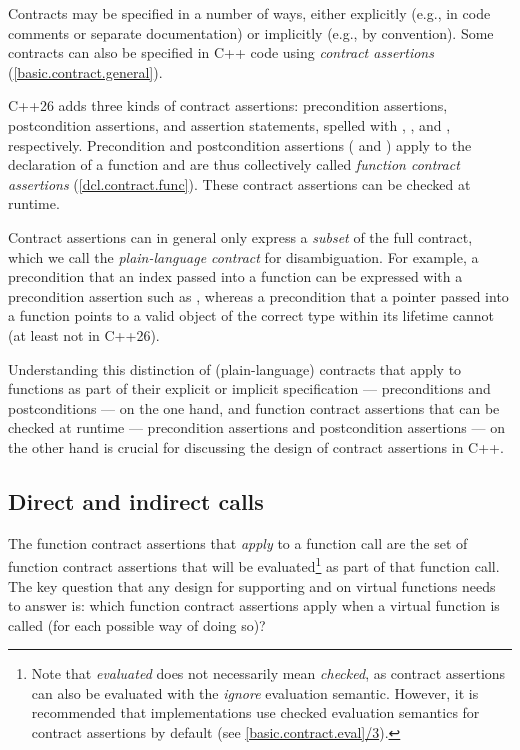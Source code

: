 Contracts may be specified in a number of ways, either explicitly (e.g., in code comments or separate documentation) or implicitly (e.g., by convention). Some contracts can also be specified in C++ code using \emph{contract assertions} (\href{https://eel.is/c++draft/basic.contract.general}{[basic.contract.general]}).

C++26 adds three kinds of contract assertions: precondition assertions, postcondition assertions, and assertion statements, spelled with , , and \mbox{}, respectively. Precondition and postcondition assertions ( and ) apply to the declaration of a function and are thus collectively called \emph{function contract assertions} (\href{https://eel.is/c++draft/dcl.contract.func}{[dcl.contract.func]}). These contract assertions can be checked at runtime.

Contract assertions can in general only express a \emph{subset} of the full contract, which we call the \emph{plain-language contract} for disambiguation. For example, a precondition that an index passed into a function can be expressed with a precondition assertion such as \mbox{}, whereas a precondition that a pointer passed into a function points to a valid object of the correct type within its lifetime cannot (at least not in C++26).

Understanding this distinction of (plain-language) contracts that apply to functions as part of their explicit or implicit specification --- preconditions and postconditions --- on the one hand, and function contract assertions that can be checked at runtime  --- precondition assertions and postcondition assertions --- on the other hand is crucial for discussing the design of contract assertions in C++.

\subsection{Direct and indirect calls}

The function contract assertions that \emph{apply} to a function call are the set of function contract assertions that will be evaluated\footnote{Note that \emph{evaluated} does not necessarily mean \emph{checked}, as contract assertions can also be evaluated with the \emph{ignore} evaluation semantic. However, it is recommended that implementations use checked evaluation semantics for contract assertions by default (see \href{https://eel.is/c++draft/basic.contract\#eval-3}{[basic.contract.eval]/3}).} as part of that function call. The key question that any design for supporting  and  on virtual functions needs to answer is: which function contract assertions apply when a virtual function is called (for each possible way of doing so)?

